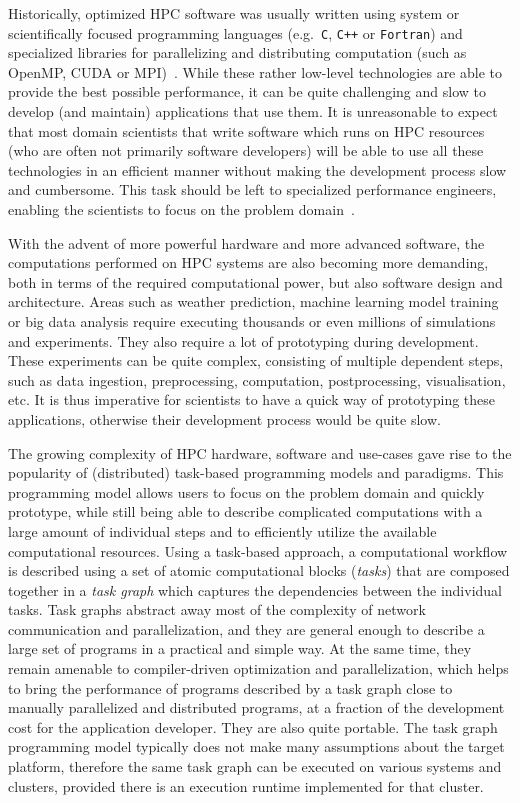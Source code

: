 Historically, optimized HPC software was usually written using system or scientifically focused
programming languages (e.g.~\texttt{C}, \texttt{C++} or
\texttt{Fortran}) and specialized libraries for parallelizing and distributing computation
(such as OpenMP, CUDA or MPI)~\cite{mpistudy}. While these rather low-level technologies are
able to provide the best possible performance, it can be quite challenging and slow to develop (and
maintain) applications that use them. It is unreasonable to expect that most domain scientists that
write software which runs on HPC resources (who are often not primarily software developers) will
be able to use all these technologies in an efficient manner without making the development process
slow and cumbersome. This task should be left to specialized performance engineers, enabling the
scientists to focus on the problem domain~\cite{dace}.

With the advent of more powerful hardware and more advanced software, the computations performed on
HPC systems are also becoming more demanding, both in terms of the required computational power,
but also software design and architecture. Areas such as weather prediction, machine learning model
training or big data analysis require executing thousands or even millions of simulations and
experiments. They also require a lot of prototyping during development. These experiments can be
quite complex, consisting of multiple dependent steps, such as data ingestion, preprocessing,
computation, postprocessing, visualisation, etc. It is thus imperative for scientists to have a
quick way of prototyping these applications, otherwise their development process would be quite
slow.

The growing complexity of HPC hardware, software and use-cases gave rise to the popularity of
(distributed) task-based programming models and paradigms. This programming model allows users to
focus on the problem domain and quickly prototype, while still being able to describe complicated
computations with a large amount of individual steps and to efficiently utilize the available
computational resources. Using a task-based approach, a computational workflow is described using a
set of atomic computational blocks (\emph{tasks}) that are composed together in a
\emph{task graph} which captures the dependencies between the individual tasks. Task graphs
abstract away most of the complexity of network communication and parallelization, and they are
general enough to describe a large set of programs in a practical and simple way. At the same time,
they remain amenable to compiler-driven optimization and parallelization, which helps to bring the
performance of programs described by a task graph close to manually parallelized and distributed
programs, at a fraction of the development cost for the application developer. They are also quite
portable. The task graph programming model typically does not make many assumptions about the
target platform, therefore the same task graph can be executed on various systems and clusters,
provided there is an execution runtime implemented for that cluster.

